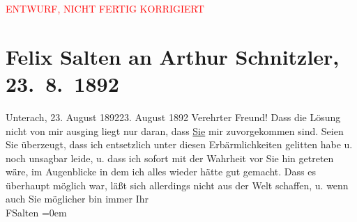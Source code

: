 
\begin{center}
            \textcolor{red}{ENTWURF, NICHT FERTIG KORRIGIERT}
                      \end{center}
            
         \renewcommand{\erwaehnteOrte}{Orte: Bahnhof, Unterach am Attersee, Wien}
         \renewcommand{\erwaehnteWerke}{}
               \section[Felix Salten an Arthur Schnitzler, 23. 8. 1892]{ Felix Salten an Arthur Schnitzler, 23. 8. 1892}\nopagebreak{}\rehead{ }\begin{ledgroupsized}[t]{13cm}\normalsize\beginnumbering \toendnotes[C]{\smallbreak\pagebreak[2]} 
\pstart
           \raggedleft{}{\pb} Unterach, 23. August 189223. August 1892\pend
           \pstart
           Verehrter Freund! Dass die Lösung nicht von mir ausging liegt nur
               daran, dass \uline{Sie} mir zuvorgekommen sind. Seien Sie
               überzeugt, dass ich entsetzlich unter diesen Erbärmlichkeiten gelitten habe u. noch
               unsagbar leide, u. dass ich sofort mit der Wahrheit vor Sie hin getreten wäre, im
               Augenblicke in dem ich alles wieder hätte gut gemacht. \pend
           \pstart
           Dass es überhaupt möglich war, läßt sich allerdings nicht aus der Welt schaffen, u.
               wenn auch Sie möglicher {\pb}bin
               immer\pend
           \pstart
           Ihr {\\[\baselineskip]}\spacefill\mbox{FSalten}\pend
           \leftskip=0em{}
         
         \endnumbering{}\end{ledgroupsized}\begin{anhang}\end{anhang}\newcommand{\dateiname}{L03113}\newcommand{\titel}{Felix Salten an Arthur Schnitzler, 23. 8. 1892}\newcommand{\editorInnen}{Martin Anton Müller und Laura Untner}
      